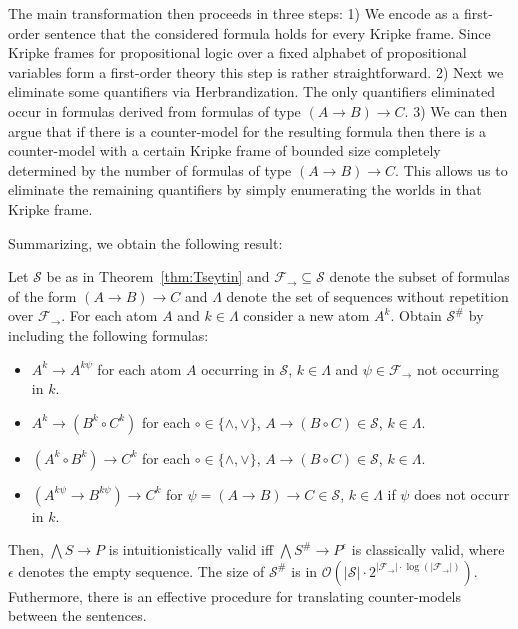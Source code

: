 \documentclass[runningheads]{llncs}
\begin{document}
The main transformation then proceeds in three steps:
%
1) We encode as a first-order sentence that the considered formula holds for every Kripke frame.
Since Kripke frames for propositional logic over a fixed alphabet of propositional variables form a first-order theory this step is rather straightforward.
%
2) Next we eliminate some quantifiers via Herbrandization. The only quantifiers eliminated occur in formulas derived from formulas of type $(A\to B)\to C$.
%
3) We can then argue that if there is a counter-model for the resulting formula then there is a counter-model with a certain Kripke frame of bounded size completely determined by the number of formulas of type $(A\to B)\to C$.
This allows us to eliminate the remaining quantifiers by simply enumerating the worlds in that Kripke frame.

Summarizing, we obtain the following result:

\begin{theorem}
\label{thm:reduction-propositional}
	Let $\mathcal S$ be as in Theorem~\ref{thm:Tseytin} and $\mathcal F_\to\subseteq\mathcal S$ denote the subset of formulas of the form $(A\to B)\to C$ and $\Lambda$ denote the set of sequences without repetition over $\mathcal F_\to$. For each atom $A$ and $k\in\Lambda$ consider a new atom $A^k$. Obtain $\mathcal S^\#$ by including the following formulas:
	\begin{itemize}
		\item $A^k\to A^{k\psi}$ for each atom $A$ occurring in $\mathcal S$, $k\in\Lambda$ and $\psi\in\mathcal F_\to$ not occurring in $k$.
		\item $A^k\to (B^k\circ C^k)$ for each $\circ\in\{\wedge,\vee\}$, $A\to (B\circ C)\in\mathcal S$, $k\in\Lambda$.
		\item $(A^k\circ B^k)\to C^k$ for each $\circ\in\{\wedge,\vee\}$, $A\to (B\circ C)\in\mathcal S$, $k\in\Lambda$.
		\item $(A^{k\psi}\to B^{k\psi})\to C^k$ for $\psi = (A\to B)\to C\in\mathcal S$, $k\in\Lambda$ if $\psi$ does not occurr in $k$.
	\end{itemize}
Then, $\bigwedge S\to P$ is intuitionistically valid iff $\bigwedge S^\#\to P^\epsilon$ is classically valid, where $\epsilon$ denotes the empty sequence. The size of $\mathcal S^\#$ is in $\mathcal O(|\mathcal S|\cdot2^{|\mathcal F_\to|\cdot\log(|\mathcal F_\to|)})$. Futhermore, there is an effective procedure for translating counter-models between the sentences.
\end{theorem}
\end{document}

